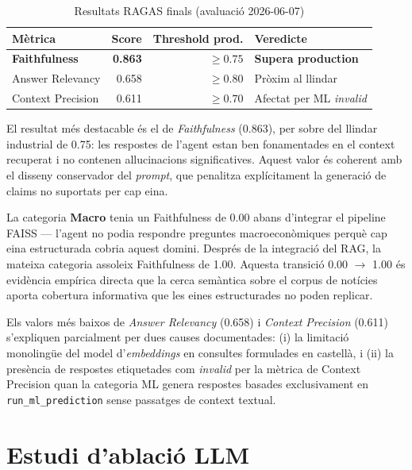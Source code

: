 \documentclass[12pt, a4paper]{report}
\begin{document}
\begin{table}[H]
\centering
\caption{Resultats RAGAS finals (avaluació 2026-06-07)}
\label{tab:ragas-results}
\begin{tabular}{@{}L{4.5cm}rrL{4.5cm}@{}}
\toprule
\textbf{Mètrica} & \textbf{Score} & \textbf{Threshold prod.} & \textbf{Veredicte} \\
\midrule
\textbf{Faithfulness}     & \textbf{0.863} & $\geq 0.75$ & \textcolor{accentgreen}{\textbf{Supera production}} \\
Answer Relevancy          & 0.658          & $\geq 0.80$ & Pròxim al llindar \\
Context Precision         & 0.611          & $\geq 0.70$ & Afectat per ML \textit{invalid} \\
\bottomrule
\end{tabular}
\end{table}

El resultat més destacable és el de \emph{Faithfulness} (0.863), per sobre del llindar industrial de 0.75: les respostes de l'agent estan ben fonamentades en el context recuperat i no contenen al\textperiodcentered{}lucinacions significatives. Aquest valor és coherent amb el disseny conservador del \textit{prompt}, que penalitza explícitament la generació de claims no suportats per cap eina.

\begin{resultbox}
La categoria \textbf{Macro} tenia un Faithfulness de 0.00 abans d'integrar el pipeline FAISS --- l'agent no podia respondre preguntes macroeconòmiques perquè cap eina estructurada cobria aquest domini. Després de la integració del RAG, la mateixa categoria assoleix Faithfulness de 1.00. Aquesta transició 0.00 $\to$ 1.00 és evidència empírica directa que la cerca semàntica sobre el corpus de notícies aporta cobertura informativa que les eines estructurades no poden replicar.
\end{resultbox}

Els valors més baixos de \emph{Answer Relevancy} (0.658) i \emph{Context Precision} (0.611) s'expliquen parcialment per dues causes documentades: (i) la limitació monolingüe del model d'\textit{embeddings} en consultes formulades en castellà, i (ii) la presència de respostes etiquetades com \textit{invalid} per la mètrica de Context Precision quan la categoria ML genera respostes basades exclusivament en \texttt{run\_ml\_prediction} sense passatges de context textual.

\section{Estudi d'ablació LLM}
\end{document}
